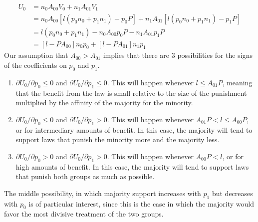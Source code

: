 \begin{align}
\nonumber U_0 &= n_0 A_{00}  V_0 + n_1 A_{01}  V_1 \\
\nonumber &= n_0 A_{00}  [l (p_0 n_0 + p_1 n_1) - p_0 P] + n_1 A_{01}  [l (p_0 n_0 + p_1 n_1) - p_1P] \\
\nonumber &= l (p_0 n_0 + p_1 n_1)  - n_0 A_{00}p_0 P - n_1 A_{01}  p_1 P \\
&=   [ l  -  P A_{00} ]n_0 p_0  + [l - P A_{01}] n_1 p_1  
\end{align}
%
%
%
Our assumption that $A_{00} > A_{01}$ %
implies that there are 3 possibilities for the signs of the coefficients on $p_0$ and $p_1$.

\begin{enumerate}
\item $\partial U_0 / \partial p_0 \leq 0$ and $\partial U_0 / \partial p_1 \leq 0$.  This will happen whenever $l \leq   A_{01}P $, meaning that the benefit from the law is small relative to the size of the punishment multiplied by the affinity of the majority for the minority.
\item $\partial U_0 / \partial p_0 \leq 0$ and $\partial U_0 / \partial p_1 > 0$.  This will happen whenever $  A_{01}P < l  \leq A_{00}P $, or for intermediary amounts of benefit.  In this case, the majority will tend to support laws that punish the minority more and the majority less.
\item $\partial U_0 / \partial p_0 > 0$ and $\partial U_0 / \partial p_1 > 0$.  This will happen whenever $   A_{00}P < l$, or for high amounts of benefit.  In this case, the majority will tend to support laws that punish both groups as much as possible.
\end{enumerate}

The middle possibility, in which majority support increases with $p_1$ but decreases with $p_0$ is of particular interest, since this is the case in which the majority would favor the most divisive treatment of the two groups.

%

